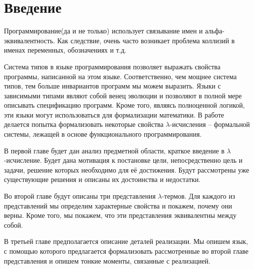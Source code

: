 \section*{Введение}

Программирование(да и не только) использует связывание имен и альфа-эквивалентность. Как следствие, очень часто возникает проблема коллизий в именах переменных, обозначениях и т.д. %


Система типов в языке программирования позволяет выражать свойства программы, написанной на этом языке. Соответственно, чем мощнее система типов, тем больше инвариантов программ мы можем выразить. Языки с зависимыми типами являют собой венец эволюции и позволяют в полной мере описывать спецификацию программ. Кроме того, являясь полноценной логикой, эти языки могут использоваться для формализации математики. В работе делается попытка формализовать некоторые свойства $\lambda$-исчисления -- формальной системы, лежащей в основе функционального программирования.

В первой главе будет дан анализ предметной области, краткое введение в $\lambda$-исчисление. Будет дана мотивация к постановке цели, непосредственно цель и задачи, решение которых необходимо для её достижения. Будут рассмотрены уже существующие решения и описаны их достоинства и недостатки.

Во второй главе будут описаны три представления $\lambda$-термов. Для каждого из представлений мы определим характерные свойства и покажем, почему они верны. Кроме того, мы покажем, что эти представления эквивалентны между собой.

В третьей главе предполагается описание деталей реализации. Мы опишем язык, с помощью которого предлагается формализовать рассмотренные во второй главе представления и опишем тонкие моменты, связанные с реализацией.
